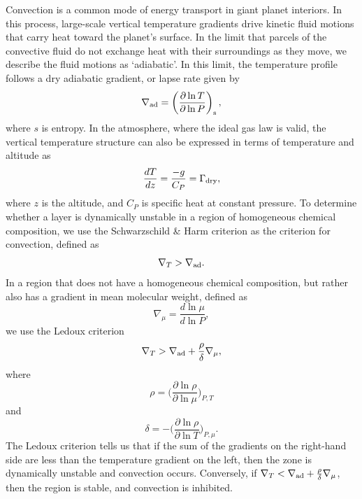 \documentclass[11pt]{ucscthesisbs}
\begin{document}
Convection is a common mode of energy transport in giant planet interiors. In this process, large-scale vertical temperature gradients drive kinetic fluid motions that carry heat toward the planet's surface. In the limit that parcels of the convective fluid do not exchange heat with their surroundings as they move, we describe the fluid motions as `adiabatic'. In this limit, the temperature profile follows a dry adiabatic gradient, or lapse rate \citep{kippenhahn_2012} given by
\begin{equation}
  \nabla_{\rm ad} = \left( \frac{\partial \ln T}{\partial \ln P} \right)_{\rm s},
  \label{eq:dry_lapse_rate}
\end{equation}
where $s$ is entropy. In the atmosphere, where the ideal gas law is valid, the vertical temperature structure can also be expressed in terms of temperature and altitude \citep{sanchez_2011} as
\begin{equation}
  \frac{dT}{dz} = \frac{-g}{C_{P}} = \Gamma_{\rm dry},
\end{equation}
where $z$ is the altitude, and $C_{P}$ is specific heat at constant pressure. To determine whether a layer is dynamically unstable in a region of homogeneous chemical composition, we use the Schwarzschild \& Harm criterion \citep{kippenhahn_2012} as the criterion for convection, defined as
 \begin{equation}
  \nabla_{T} > \nabla_{\rm ad}.
\end{equation}
In a region that does not have a homogeneous chemical composition, but rather also has a gradient in mean molecular weight, defined as
 \begin{equation}
 \nabla_{\mu} = \frac{d \ln \mu}{d \ln P}, 
\end{equation}
 we use the Ledoux criterion\citep{kippenhahn_2012}
\begin{equation}
  \nabla_{T} > \nabla_{\rm ad} + \frac{\rho}{\delta}\nabla_{\mu},
  \label{eq:ledoux}
\end{equation}
where
\begin{equation}
  \rho = \bigg(\frac{\partial \ln \rho}{\partial \ln \mu}\bigg)_{P,T}
\end{equation}
and
\begin{equation}
 \delta = -\bigg(\frac{\partial \ln \rho}{\partial \ln T}\bigg)_{P,\mu}.
\end{equation}
The Ledoux criterion tells us that if the sum of the gradients on the right-hand side are less than the temperature gradient on the left, then the zone is dynamically unstable and convection occurs. Conversely, if $\nabla_{T} < \nabla_{\rm ad} + \frac{\rho}{\delta}\nabla_{\mu}$, then the region is stable, and convection is inhibited.
\end{document}
